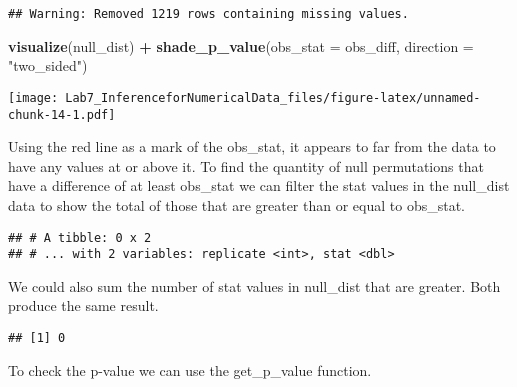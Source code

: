 \documentclass[
]{article}
\newenvironment{Shaded}{\begin{snugshade}}{\end{snugshade}}
\newcommand{\DataTypeTok}[1]{\textcolor[rgb]{0.13,0.29,0.53}{#1}}
\newcommand{\KeywordTok}[1]{\textcolor[rgb]{0.13,0.29,0.53}{\textbf{#1}}}
\newcommand{\NormalTok}[1]{#1}
\newcommand{\OperatorTok}[1]{\textcolor[rgb]{0.81,0.36,0.00}{\textbf{#1}}}
\newcommand{\StringTok}[1]{\textcolor[rgb]{0.31,0.60,0.02}{#1}}
\begin{document}
\begin{verbatim}
## Warning: Removed 1219 rows containing missing values.
\end{verbatim}

\begin{Shaded}
\begin{Highlighting}[]
\KeywordTok{visualize}\NormalTok{(null_dist) }\OperatorTok{+}\StringTok{ }
\StringTok{  }\KeywordTok{shade_p_value}\NormalTok{(}\DataTypeTok{obs_stat =}\NormalTok{ obs_diff, }\DataTypeTok{direction =} \StringTok{"two_sided"}\NormalTok{)}
\end{Highlighting}
\end{Shaded}

\texttt{[image: Lab7\_InferenceforNumericalData\_files/figure-latex/unnamed-chunk-14-1.pdf]}

Using the red line as a mark of the obs\_stat, it appears to far from
the data to have any values at or above it. To find the quantity of null
permutations that have a difference of at least obs\_stat we can filter
the stat values in the null\_dist data to show the total of those that
are greater than or equal to obs\_stat.

\begin{Shaded}
\end{Shaded}

\begin{verbatim}
## # A tibble: 0 x 2
## # ... with 2 variables: replicate <int>, stat <dbl>
\end{verbatim}

We could also sum the number of stat values in null\_dist that are
greater. Both produce the same result.

\begin{Shaded}
\end{Shaded}

\begin{verbatim}
## [1] 0
\end{verbatim}

To check the p-value we can use the get\_p\_value function.
\end{document}
